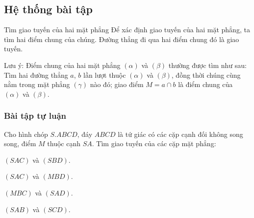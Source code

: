 \subsection{Hệ thống bài tập}
\begin{dang}{Tìm giao tuyến của hai mặt phẳng}
	Để xác định giao tuyến của hai mặt phẳng, ta tìm hai điểm chung của chúng. Đường thẳng đi qua hai điểm chung đó là giao tuyến.
	\begin{note}
		Lưu ý: Điểm chung của hai mặt phẳng $(\alpha)$ và $(\beta)$ thường được tìm như sau: Tìm hai đường thẳng $a$, $b$ lần lượt thuộc $(\alpha)$ và $(\beta)$, đồng thời chúng cùng nằm trong mặt phẳng $(\gamma)$ nào đó; giao điểm $M=a\cap b$ là điểm chung của $(\alpha)$ và $(\beta)$.
	\end{note}
\end{dang}
\subsubsection{Bài tập tự luận}
\begin{bt}%
	Cho hình chóp $S.ABCD$, đáy $ABCD$ là tứ giác có các cặp cạnh đối không song song, điểm $M$ thuộc cạnh $SA$. Tìm giao tuyến của các cặp mặt phẳng:
	\begin{listEX}[2]
		\item $(SAC)$ và $(SBD)$.
		\item $(SAC)$ và $(MBD)$.
		\item $(MBC)$ và $(SAD)$.
		\item $(SAB)$ và $(SCD)$.
	\end{listEX}
\end{bt}
